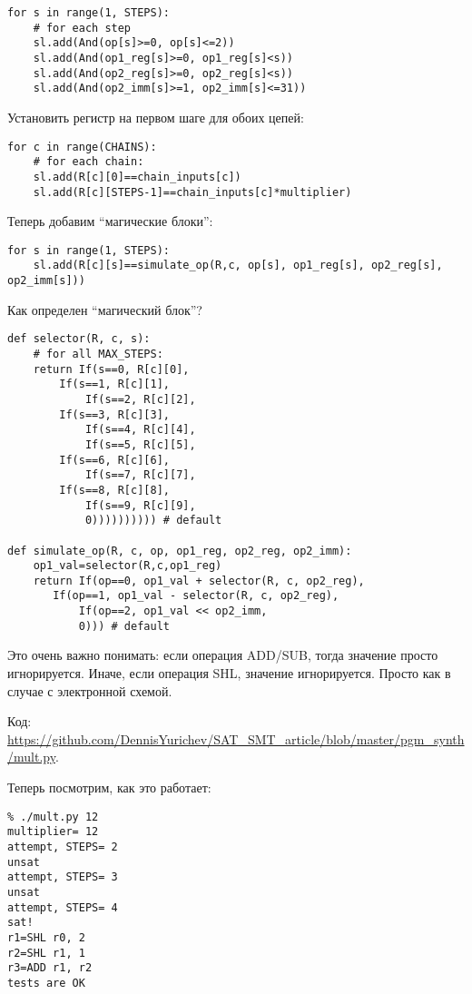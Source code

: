 \begin{lstlisting}
for s in range(1, STEPS):
    # for each step
    sl.add(And(op[s]>=0, op[s]<=2))
    sl.add(And(op1_reg[s]>=0, op1_reg[s]<s))
    sl.add(And(op2_reg[s]>=0, op2_reg[s]<s))
    sl.add(And(op2_imm[s]>=1, op2_imm[s]<=31))
\end{lstlisting}

Установить регистр на первом шаге для обоих цепей:

\begin{lstlisting}
for c in range(CHAINS):
    # for each chain:
    sl.add(R[c][0]==chain_inputs[c])
    sl.add(R[c][STEPS-1]==chain_inputs[c]*multiplier)
\end{lstlisting}

Теперь добавим ``магические блоки'':

\begin{lstlisting}
for s in range(1, STEPS):
    sl.add(R[c][s]==simulate_op(R,c, op[s], op1_reg[s], op2_reg[s], op2_imm[s]))
\end{lstlisting}

Как определен ``магический блок''?

\begin{lstlisting}
def selector(R, c, s):
    # for all MAX_STEPS:
    return If(s==0, R[c][0],
	    If(s==1, R[c][1],
            If(s==2, R[c][2],
	    If(s==3, R[c][3],
            If(s==4, R[c][4],
            If(s==5, R[c][5],
	    If(s==6, R[c][6],
            If(s==7, R[c][7],
	    If(s==8, R[c][8],
            If(s==9, R[c][9],
	        0)))))))))) # default

def simulate_op(R, c, op, op1_reg, op2_reg, op2_imm):
    op1_val=selector(R,c,op1_reg)
    return If(op==0, op1_val + selector(R, c, op2_reg),
	   If(op==1, op1_val - selector(R, c, op2_reg),
           If(op==2, op1_val << op2_imm,
	       0))) # default
\end{lstlisting}

Это очень важно понимать: если операция ADD/SUB, тогда значение  просто игнорируется.
Иначе, если операция SHL, значение  игнорируется.
Просто как в случае с электронной схемой.

Код: \url{https://github.com/DennisYurichev/SAT_SMT_article/blob/master/pgm_synth/mult.py}.

Теперь посмотрим, как это работает:

\begin{lstlisting}
% ./mult.py 12
multiplier= 12
attempt, STEPS= 2
unsat
attempt, STEPS= 3
unsat
attempt, STEPS= 4
sat!
r1=SHL r0, 2
r2=SHL r1, 1
r3=ADD r1, r2
tests are OK
\end{lstlisting}

